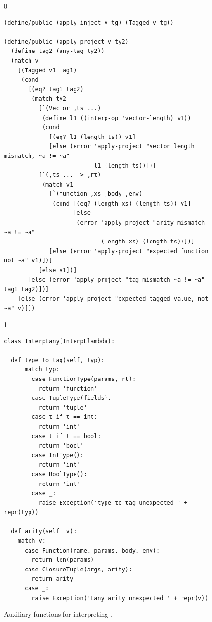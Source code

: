 \documentclass[7x10]{TimesAPriori_MIT}%
\def\racketEd{0}
\def\pythonEd{1}
\def\edition{1}
\newcommand{\pythonColor}[0]{}
\numberwithin{theorem}{chapter}
\numberwithin{definition}{chapter}
\numberwithin{equation}{chapter}
\begin{document}
\begin{figure}[tbp]
  \begin{tcolorbox}[colback=white]  
{\if\edition\racketEd
\begin{lstlisting}[basicstyle=\ttfamily\footnotesize]
(define/public (apply-inject v tg) (Tagged v tg))

(define/public (apply-project v ty2)
  (define tag2 (any-tag ty2))
  (match v
    [(Tagged v1 tag1)
     (cond
       [(eq? tag1 tag2)
        (match ty2
          [`(Vector ,ts ...)
           (define l1 ((interp-op 'vector-length) v1))
           (cond
             [(eq? l1 (length ts)) v1]
             [else (error 'apply-project "vector length mismatch, ~a != ~a"
                          l1 (length ts))])]
          [`(,ts ... -> ,rt)
           (match v1
             [`(function ,xs ,body ,env)
              (cond [(eq? (length xs) (length ts)) v1]
                    [else
                     (error 'apply-project "arity mismatch ~a != ~a"
                            (length xs) (length ts))])]
             [else (error 'apply-project "expected function not ~a" v1)])]
          [else v1])]
       [else (error 'apply-project "tag mismatch ~a != ~a" tag1 tag2)])]
    [else (error 'apply-project "expected tagged value, not ~a" v)]))
\end{lstlisting}
\fi}
{\if\edition\pythonEd\pythonColor
\begin{lstlisting}
class InterpLany(InterpLlambda):

  def type_to_tag(self, typ):
      match typ:
        case FunctionType(params, rt):
          return 'function'
        case TupleType(fields):
          return 'tuple'
        case t if t == int:
          return 'int'
        case t if t == bool:
          return 'bool'
        case IntType():
          return 'int'
        case BoolType():
          return 'int'
        case _:
          raise Exception('type_to_tag unexpected ' + repr(typ))

  def arity(self, v):
    match v:
      case Function(name, params, body, env):
        return len(params)
      case ClosureTuple(args, arity):
        return arity
      case _:
        raise Exception('Lany arity unexpected ' + repr(v))
\end{lstlisting}
\fi}
  \end{tcolorbox}

  \caption{Auxiliary functions for interpreting \LangAny{}.}
  \label{fig:interp-Lany-aux}
\end{figure}
\end{document}
